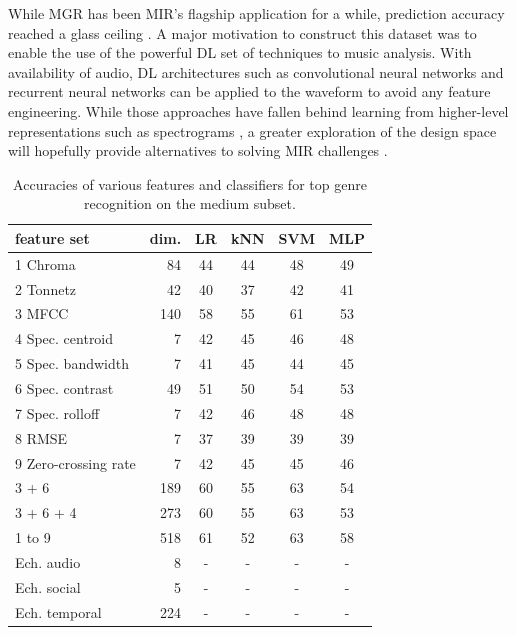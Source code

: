\documentclass{article}
\newcommand{\tspaceb}{\hspace{0.9em}}
\begin{document}

While MGR has been MIR's flagship application for a while, prediction accuracy reached a glass ceiling \cite{mgr_why}.
A major motivation to construct this dataset was to enable the use of the powerful DL set of techniques to music analysis.
With availability of audio, DL architectures such as convolutional neural networks and recurrent neural networks can be applied to the waveform to avoid any feature engineering. While those approaches have fallen behind learning from higher-level representations such as spectrograms \cite{dieleman_endtoend}, a greater exploration of the design space will hopefully provide alternatives to solving MIR challenges \cite{mir_dl_feature_learning}.


\begin{table}
	\centering
	\begin{tabular}{l@{\tspaceb}r@{\tspaceb}c@{\tspaceb}c@{\tspaceb}c@{\tspaceb}c}
		\toprule
		feature set & dim. & LR & kNN & SVM & MLP \\
		\midrule
		1 Chroma \cite{chroma} & 84 & 44 & 44 & 48 & 49 \\
		2 Tonnetz \cite{tonnetz} & 42 & 40 & 37 & 42 & 41 \\
		3 MFCC \cite{mfcc} & 140 & 58 & 55 & 61 & 53 \\
		4 Spec. centroid & 7 & 42 & 45 & 46 & 48 \\
		5 Spec. bandwidth & 7 & 41 & 45 & 44 & 45\\
		6 Spec. contrast \cite{contrast} & 49 & 51 & 50 & 54 & 53 \\
		7 Spec. rolloff & 7 & 42 & 46 & 48 & 48 \\
		8 RMSE & 7 & 37 & 39 & 39 & 39 \\ %
		9 Zero-crossing rate & 7 & 42 & 45 & 45 & 46 \\
		\midrule
		3 + 6 & 189 & 60 & 55 & 63 & 54 \\
		3 + 6 + 4 & 273 & 60 & 55 & 63 & 53 \\
		1 to 9 & 518 & 61 & 52 & 63 & 58 \\
		\midrule
		Ech. audio & 8 & - & - & - & - \\
		Ech. social & 5 & - & - & - & - \\
		Ech. temporal \cite{echonest_temporal} & 224 & - & - & - & - \\
		\bottomrule
	\end{tabular}
	\caption{Accuracies of various features and classifiers for top genre recognition on the medium subset.}
	\label{tab:mgr}
	\label{tab:features}
\end{table}
\end{document}
